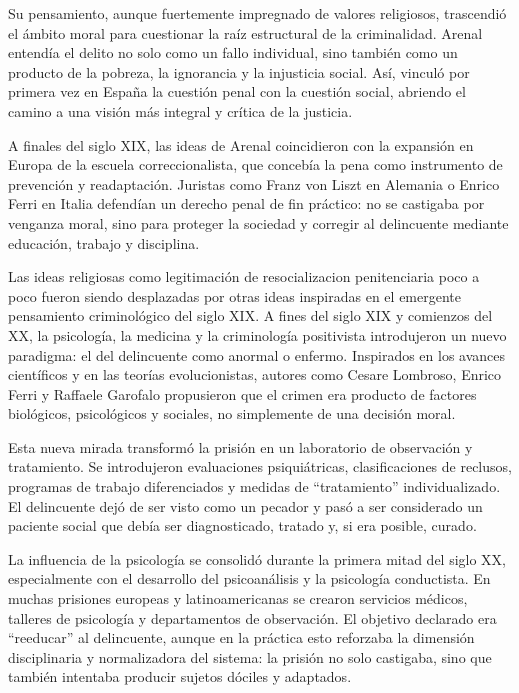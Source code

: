 \documentclass[
  spanish,
  letterpaper,
  DIV=11,
  numbers=noendperiod]{scrreprt}
\begin{document}
Su pensamiento, aunque fuertemente impregnado de valores religiosos,
trascendió el ámbito moral para cuestionar la raíz estructural de la
criminalidad. Arenal entendía el delito no solo como un fallo
individual, sino también como un producto de la pobreza, la ignorancia y
la injusticia social. Así, vinculó por primera vez en España la cuestión
penal con la cuestión social, abriendo el camino a una visión más
integral y crítica de la justicia.

A finales del siglo XIX, las ideas de Arenal coincidieron con la
expansión en Europa de la escuela correccionalista, que concebía la pena
como instrumento de prevención y readaptación. Juristas como Franz von
Liszt en Alemania o Enrico Ferri en Italia defendían un derecho penal de
fin práctico: no se castigaba por venganza moral, sino para proteger la
sociedad y corregir al delincuente mediante educación, trabajo y
disciplina.

Las ideas religiosas como legitimación de resocializacion penitenciaria
poco a poco fueron siendo desplazadas por otras ideas inspiradas en el
emergente pensamiento criminológico del siglo XIX. A fines del siglo XIX
y comienzos del XX, la psicología, la medicina y la criminología
positivista introdujeron un nuevo paradigma: el del delincuente como
anormal o enfermo. Inspirados en los avances científicos y en las
teorías evolucionistas, autores como Cesare Lombroso, Enrico Ferri y
Raffaele Garofalo propusieron que el crimen era producto de factores
biológicos, psicológicos y sociales, no simplemente de una decisión
moral.

Esta nueva mirada transformó la prisión en un laboratorio de observación
y tratamiento. Se introdujeron evaluaciones psiquiátricas,
clasificaciones de reclusos, programas de trabajo diferenciados y
medidas de ``tratamiento'' individualizado. El delincuente dejó de ser
visto como un pecador y pasó a ser considerado un paciente social que
debía ser diagnosticado, tratado y, si era posible, curado.

La influencia de la psicología se consolidó durante la primera mitad del
siglo XX, especialmente con el desarrollo del psicoanálisis y la
psicología conductista. En muchas prisiones europeas y latinoamericanas
se crearon servicios médicos, talleres de psicología y departamentos de
observación. El objetivo declarado era ``reeducar'' al delincuente,
aunque en la práctica esto reforzaba la dimensión disciplinaria y
normalizadora del sistema: la prisión no solo castigaba, sino que
también intentaba producir sujetos dóciles y adaptados.
\end{document}
